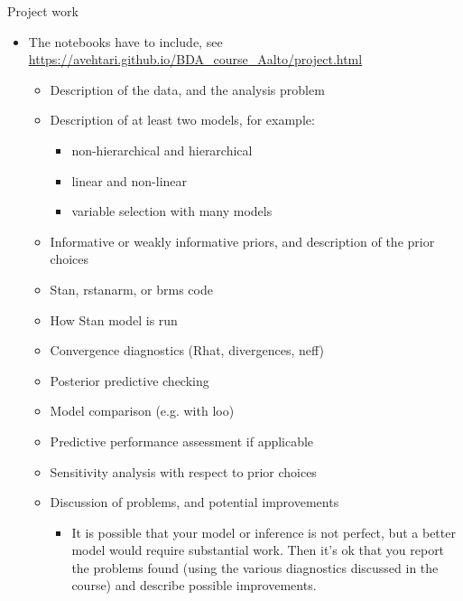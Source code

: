\documentclass[t]{beamer}
\begin{document}
\begin{frame}
  
  {\Large\color{navyblue} Project work}

  \begin{itemize}
  \item The notebooks have to include, see \url{https://avehtari.github.io/BDA_course_Aalto/project.html}
    \begin{itemize}
    \item Description of the data, and the analysis problem
    \item Description of at least two models, for example:
      \begin{itemize}
      \item non-hierarchical and hierarchical
      \item linear and non-linear
      \item variable selection with many models
    \end{itemize}
    \item Informative or weakly informative priors, and description of the prior choices
    \item Stan, rstanarm, or brms code
    \item How Stan model is run
    \item Convergence diagnostics (Rhat, divergences, neff)
    \item Posterior predictive checking
    \item Model comparison (e.g. with loo)
    \item Predictive performance assessment if applicable
    \item Sensitivity analysis with respect to prior choices
    \item Discussion of problems, and potential improvements 
      \begin{itemize}
      \item It is possible that your model or inference is not perfect, but a better model would require substantial work. Then it's ok that you report the problems found (using the various diagnostics discussed in the course) and describe possible improvements.
      \end{itemize}
    \end{itemize}
  \end{itemize}
\end{frame}
\end{document}
